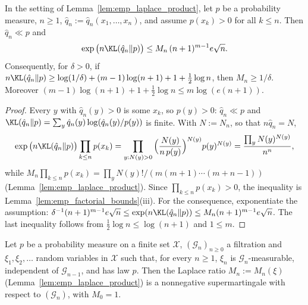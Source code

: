 \begin{lemma}\label{lem:emp_laplace_lower_bound}
\leanok
{}
In the setting of Lemma~\ref{lem:emp_laplace_product}, let $p$ be a probability measure, $n \ge 1$,
$\hat q_n := \hat q_n(x_1, \dots, x_n)$, and assume $p(x_k) > 0$ for all $k \le n$. Then
$\hat q_n \ll p$ and
\[
  \exp\big(n \KL(\hat q_n \| p)\big) \le M_n\, (n + 1)^{m - 1} e \sqrt n .
\]
Consequently, for $\delta > 0$, if
$n \KL(\hat q_n \| p) \ge \log(1/\delta) + (m - 1)\log(n + 1) + 1 + \frac12 \log n$, then
$M_n \ge 1/\delta$. Moreover
$(m - 1)\log(n + 1) + 1 + \frac12 \log n \le m \log(e(n + 1))$.
\end{lemma}

\begin{proof}
\leanok
{}
Every $y$ with $\hat q_n(y) > 0$ is some $x_k$, so $p(y) > 0$: $\hat q_n \ll p$ and
$\KL(\hat q_n \| p) = \sum_y \hat q_n(y) \log(\hat q_n(y)/p(y))$ is finite. With $N := N_n$, so
that $n \hat q_n = N$,
\[
  \exp\big(n \KL(\hat q_n \| p)\big) \prod_{k \le n} p(x_k)
  = \prod_{y : N(y) > 0} \Big(\frac{N(y)}{n\, p(y)}\Big)^{N(y)} p(y)^{N(y)}
  = \frac{\prod_y N(y)^{N(y)}}{n^n} ,
\]
while $M_n \prod_{k \le n} p(x_k) = \prod_y N(y)!/(m (m + 1) \cdots (m + n - 1))$
(Lemma~\ref{lem:emp_laplace_product}). Since $\prod_{k \le n} p(x_k) > 0$, the inequality is
Lemma~\ref{lem:emp_factorial_bounds}(iii). For the consequence, exponentiate the assumption:
$\delta^{-1} (n + 1)^{m - 1} e \sqrt n \le \exp(n \KL(\hat q_n \| p)) \le M_n (n + 1)^{m - 1} e \sqrt n$.
The last inequality follows from $\frac12 \log n \le \log(n + 1)$ and $1 \le m$.
\end{proof}

\begin{lemma}\label{lem:emp_laplace_supermartingale}
\leanok
{}
Let $p$ be a probability measure on a finite set $\mathcal X$, $(\mathcal G_n)_{n \ge 0}$ a
filtration and $\xi_1, \xi_2, \dots$ random variables in $\mathcal X$ such that, for every
$n \ge 1$, $\xi_n$ is $\mathcal G_n$-measurable, independent of $\mathcal G_{n-1}$, and has law
$p$. Then the Laplace ratio $M_n := M_n(\xi)$ (Lemma~\ref{lem:emp_laplace_product}) is a
nonnegative supermartingale with respect to $(\mathcal G_n)$, with $M_0 = 1$.
\end{lemma}

